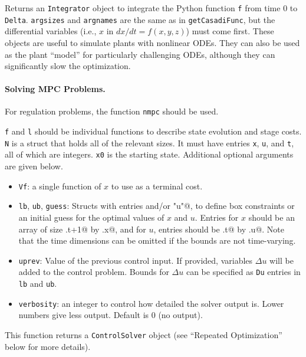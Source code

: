 \documentclass{article}
\begin{document}
\begin{multicols}{2}
Returns an \texttt{Integrator} object to integrate the Python function \texttt{f} from time 0 to \texttt{Delta}.
\texttt{argsizes} and \texttt{argnames} are the same as in \texttt{getCasadiFunc}, but the differential variables (i.e., $x$ in $dx/dt = f(x,y,z)$) must come first.
These objects are useful to simulate plants with nonlinear ODEs.
They can also be used as the plant ``model'' for particularly challenging ODEs, although they can significantly slow the optimization.

\paragraph*{Solving MPC Problems.}

For regulation problems, the function \texttt{nmpc} should be used.


\texttt{f} and \texttt{l} should be individual \casadi{} functions to describe state evolution and stage costs.
\texttt{N} is a struct that holds all of the relevant sizes.
It must have entries \lstinline|x|, \lstinline|u|, and \lstinline|t|, all of which are integers.
\texttt{x0} is the starting state.
Additional optional arguments are given below.

\begin{itemize}[noitemsep,nolistsep]
    \item \texttt{Vf}: a single \casadi{} function of $x$ to use as a terminal cost.
    \item \texttt{lb}, \texttt{ub}, \texttt{guess}: Structs with entries \lstinline@x@ and/or \lstinline@"u"@, to define box constraints or an initial guess for the optimal values of $x$ and $u$.
    Entries for $x$ should be an array of size \lstinline@N.t+1@ by \lstinline@N.x@, and for $u$, entries should be \lstinline@N.t@ by \lstinline@N.u@.
    Note that the time dimensions can be omitted if the bounds are not time-varying.
    \item \texttt{uprev}: Value of the previous control input.
    If provided, variables $\Delta u$ will be added to the control problem.
    Bounds for $\Delta u$ can be specified as \lstinline|Du| entries in \texttt{lb} and \texttt{ub}.
    \item \texttt{verbosity}: an integer to control how detailed the solver output is.
    Lower numbers give less output. Default is 0 (no output).
\end{itemize}

This function returns a \texttt{ControlSolver} object (see ``Repeated Optimization'' below for more details).


\end{multicols}
\end{document}
